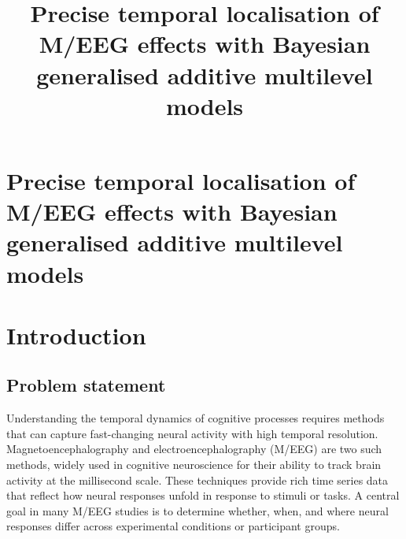 \documentclass[
  doc,
  floatsintext,
  longtable,
  a4paper,
  nolmodern,
  notxfonts,
  notimes,
  donotrepeattitle,
  colorlinks=true,linkcolor=blue,citecolor=blue,urlcolor=blue]{apa7}
\title{Precise temporal localisation of M/EEG effects with Bayesian
generalised additive multilevel models}
\begin{document}
\maketitle

\hypertarget{toc}{}
\tableofcontents
\newpage
\section[Introduction]{Precise temporal localisation of M/EEG effects
with Bayesian generalised additive multilevel models}

\setcounter{secnumdepth}{-\maxdimen} %

\setlength\LTleft{0pt}

\resetlinenumber[1]

\section{Introduction}\label{introduction}

\subsection{Problem statement}\label{problem-statement}

Understanding the temporal dynamics of cognitive processes requires
methods that can capture fast-changing neural activity with high
temporal resolution. Magnetoencephalography and electroencephalography
(M/EEG) are two such methods, widely used in cognitive neuroscience for
their ability to track brain activity at the millisecond scale. These
techniques provide rich time series data that reflect how neural
responses unfold in response to stimuli or tasks. A central goal in many
M/EEG studies is to determine whether, when, and where neural responses
differ across experimental conditions or participant groups.
\end{document}
